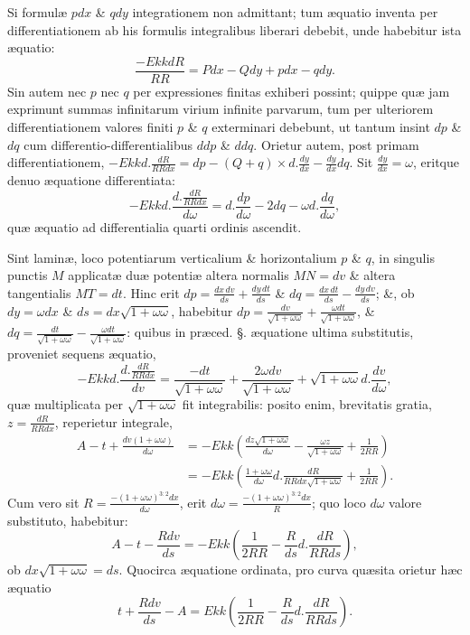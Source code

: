 Si formulæ $pdx$ \& $qdy$ integrationem non admittant; tum æquatio inventa per differentiationem ab his formulis integralibus liberari debebit, unde habebitur ista æquatio:
\[\frac{-EkkdR}{RR}=Pdx-Qdy+pdx-qdy.\]
Sin autem nec $p$ nec $q$ per expressiones finitas exhiberi possint; quippe quæ jam exprimunt summas infinitarum virium infinite parvarum, tum per ulteriorem differentiationem valores finiti $p$ \& $q$ exterminari debebunt, ut tantum insint $dp$ \& $dq$ cum differentio-differentialibus $ddp$ \& $ddq$. Orietur autem, post primam differentiationem, $-Ekkd.\frac{dR}{RRdx}=dp-(Q+q)\times d.\frac{dy}{dx}-\frac{dy}{dx}dq$. Sit $\frac{dy}{dx}=\omega$, eritque denuo æquatione differentiata:
\[-Ekkd.\frac{d.\frac{dR}{RRdx}}{d\omega}=d.\frac{dp}{d\omega}-2dq-\omega d.\frac{dq}{d\omega},\]
quæ æquatio ad differentialia quarti ordinis ascendit.

Sint laminæ, loco potentiarum verticalium \& horizontalium $p$ \& $q$, in singulis punctis $M$ applicatæ duæ potentiæ altera normalis $MN=dv$ \& altera tangentialis $MT=dt$. Hinc erit $dp=\frac{dx\,dv}{ds}+\frac{dy\,dt}{ds}$ \& $dq=\frac{dx\,dt}{ds}-\frac{dy\,dv}{ds}$; \&, ob $dy=\omega dx$ \& $ds=dx\sqrt{1+\omega\omega}$, habebitur $dp=\frac{dv}{\sqrt{1+\omega\omega}}+\frac{\omega dt}{\sqrt{1+\omega\omega}}$, \& $dq=\frac{dt}{\sqrt{1+\omega\omega}}-\frac{\omega dt}{\sqrt{1+\omega\omega}}$: quibus in præced. §. æquatione ultima substitutis, proveniet sequens æquatio,
\[-Ekkd.\frac{d.\frac{dR}{RRdx}}{dv}=\frac{-dt}{\sqrt{1+\omega\omega}}+\frac{2\omega dv}{\sqrt{1+\omega\omega}}+\sqrt{1+\omega\omega}d.\frac{dv}{d\omega},\]
quæ multiplicata per $\sqrt{1+\omega\omega}$ fit integrabilis: posito enim, brevitatis gratia, $z=\frac{dR}{RRdx}$, reperietur integrale,
\[\begin{aligned}
A-t+\frac{dv(1+\omega\omega)}{d\omega}&=-Ekk\left(\frac{dz\sqrt{1+\omega\omega}}{d\omega}-\frac{\omega z}{\sqrt{1+\omega\omega}}+\frac1{2RR}\right)\\
&=-Ekk\left(\frac{1+\omega\omega}{d\omega}d.\frac{dR}{RRdx\sqrt{1+\omega\omega}}+\frac1{2RR}\right).
\end{aligned}\]
Cum vero sit $R=\frac{-(1+\omega\omega)^{3:2}dx}{d\omega}$, erit $d\omega=\frac{-(1+\omega\omega)^{3:2}dx}R$; quo loco $d\omega$ valore substituto, habebitur:
\[A-t-\frac{Rdv}{ds}=-Ekk\left(\frac1{2RR}-\frac R{ds}d.\frac{dR}{RRds}\right),\]
ob $dx\sqrt{1+\omega\omega}=ds$. Quocirca æquatione ordinata, pro curva quæsita orietur hæc æquatio
\[t+\frac{Rdv}{ds}-A=Ekk\left(\frac1{2RR}-\frac R{ds}d.\frac{dR}{RRds}\right).\]

